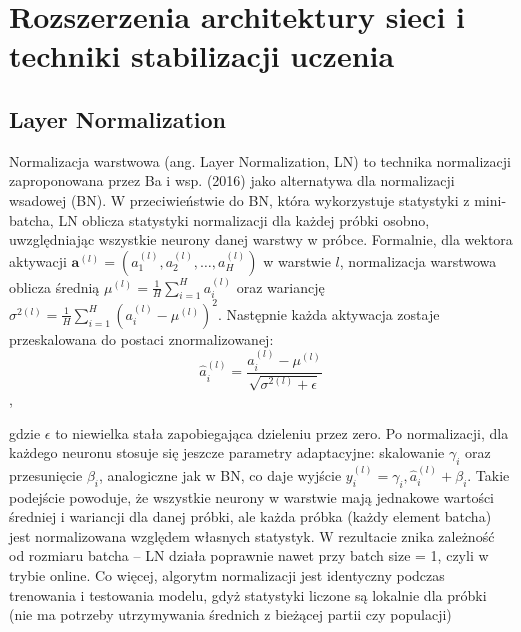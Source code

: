 \section{Rozszerzenia architektury sieci i techniki stabilizacji uczenia}

\subsection*{Layer Normalization}

Normalizacja warstwowa (ang. Layer Normalization, LN) to technika normalizacji zaproponowana przez Ba i wsp. (2016) jako alternatywa dla normalizacji wsadowej (BN). \cite{ba2016layernormalization} W przeciwieństwie do BN, która wykorzystuje statystyki z mini-batcha, LN oblicza statystyki normalizacji dla każdej próbki osobno, uwzględniając wszystkie neurony danej warstwy w próbce. Formalnie, dla wektora aktywacji $\mathbf{a}^{(l)} = (a_1^{(l)}, a_2^{(l)}, \dots, a_H^{(l)})$ w warstwie $l$, normalizacja warstwowa oblicza średnią $\mu^{(l)} = \frac{1}{H}\sum_{i=1}^{H}a_{i}^{(l)}$ oraz wariancję $\sigma^{2(l)} = \frac{1}{H}\sum_{i=1}^{H}(a_{i}^{(l)} - \mu^{(l)})^2$. Następnie każda aktywacja zostaje przeskalowana do postaci znormalizowanej:
\[\hat{a}_i^{(l)} = \frac{a_i^{(l)}-\mu^{(l)}}{\sqrt{\sigma^{2(l)}+\epsilon}}\],

gdzie $\epsilon$ to niewielka stała zapobiegająca dzieleniu przez zero. Po normalizacji, dla każdego neuronu stosuje się jeszcze parametry adaptacyjne: skalowanie $\gamma_i$ oraz przesunięcie $\beta_i$, analogiczne jak w BN, co daje wyjście $y_{i}^{(l)} = \gamma_i,\hat{a}_{i}^{(l)} + \beta_i$. Takie podejście powoduje, że wszystkie neurony w warstwie mają jednakowe wartości średniej i wariancji dla danej próbki, ale każda próbka (każdy element batcha) jest normalizowana względem własnych statystyk. W rezultacie znika zależność od rozmiaru batcha – LN działa poprawnie nawet przy batch size = 1, czyli w trybie online. Co więcej, algorytm normalizacji jest identyczny podczas trenowania i testowania modelu, gdyż statystyki liczone są lokalnie dla próbki (nie ma potrzeby utrzymywania średnich z bieżącej partii czy populacji)

